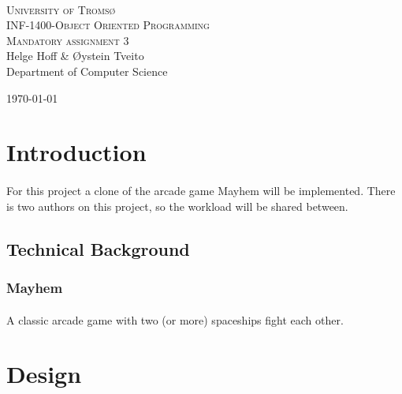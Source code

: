 \documentclass{article}
\def \thetitle {INF-1400-Object Oriented Programming}
\def \thesubtitle {Mandatory assignment 3}
\def \theauthor {Helge Hoff \& Øystein Tveito}
\begin{document}

\begin{titlepage}
\begin{center}

\textsc{\\[3.5cm] \huge University of Tromsø}\\[1.5cm]

\textsc{\LARGE \thetitle}\\[0.5cm]

\textsc{\Large \thesubtitle}\\[1.5cm]

\LARGE{\theauthor} \\[0.5cm] \large{Department of Computer Science}

\vfill
{\large \today}

\end{center}
\thispagestyle{empty}
\end{titlepage}

\newpage{}



\tableofcontents


\newpage{}


\section{Introduction}
\paragraph{}
For this project a clone of the arcade game Mayhem will be implemented. There is two authors on this project, so the workload will be shared between.
\subsection{Technical Background}
\subsubsection{Mayhem} 
\paragraph{}
A classic arcade game with two (or more) spaceships fight each other. 
\section{Design}
\end{document}
